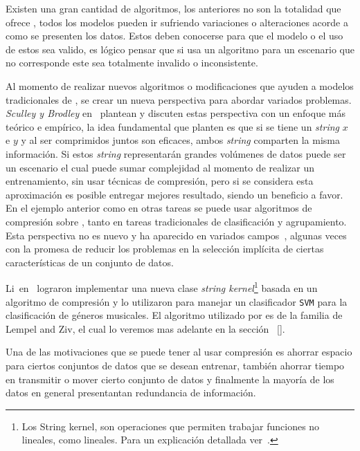 \vspace{1cm}

Existen una gran cantidad de algoritmos, los anteriores no son la totalidad que ofrece \machinelearning, todos los modelos pueden ir sufriendo variaciones o alteraciones acorde a como se presenten los datos. Estos deben conocerse para que el modelo o el uso de estos sea valido, es lógico pensar que si usa un algoritmo para un escenario que no corresponde este sea totalmente invalido o inconsistente.



Al momento de realizar nuevos algoritmos o modificaciones que ayuden a modelos tradicionales de \machinelearning, se crear un nueva perspectiva para abordar variados problemas. \emph{Sculley y Brodley} en~\cite{Sculley2006} plantean y discuten estas perspectiva con un enfoque más teórico e empírico, la idea fundamental que planten es que si se tiene un \emph{string} $x$ e $y$ y al ser comprimidos juntos son eficaces, ambos \emph{string} comparten la misma información. Si estos \emph{string} representarán grandes volúmenes de datos puede ser un escenario el cual puede sumar complejidad al momento de realizar un entrenamiento, sin usar técnicas de compresión, pero si se considera esta aproximación es posible entregar mejores resultado, siendo un beneficio a favor. En el ejemplo anterior como en otras tareas se puede usar algoritmos de compresión sobre \machinelearning, tanto en tareas tradicionales de clasificación y agrupamiento.  Esta perspectiva no es nuevo y ha aparecido en variados campos~\cite{Sculley2006}, algunas veces con la promesa de reducir los problemas en la selección implícita de ciertas características de un conjunto de datos. 

Li~\etal en~\cite{Li2005} lograron implementar una nueva clase \emph{string kernel}\footnote{Los String kernel, son operaciones que permiten trabajar funciones no lineales, como lineales. Para un explicación detallada ver~\cite{Li2005}.} basada en un algoritmo de compresión y lo utilizaron para manejar un clasificador \texttt{SVM} para la clasificación de géneros musicales. El algoritmo utilizado por \cite{Sculley2006} es de la familia de {Lempel and Ziv}, el cual lo veremos mas adelante en la sección ~\ref{}.


Una de las motivaciones que se puede tener al usar compresión es ahorrar espacio para ciertos conjuntos de datos que se desean entrenar, también ahorrar tiempo en transmitir o mover cierto conjunto de datos y finalmente la mayoría de los datos en general presentantan redundancia de información.

